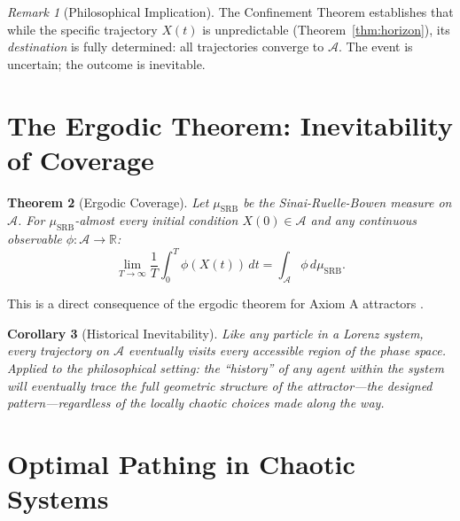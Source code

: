 \documentclass[12pt, a4paper]{article}
\theoremstyle{plain}
\newtheorem{theorem}{Theorem}[section]
\newtheorem{corollary}[theorem]{Corollary}
\theoremstyle{definition}
\theoremstyle{remark}
\newtheorem{remark}[theorem]{Remark}
\newcommand{\R}{\mathbb{R}}
\newcommand{\calA}{\mathcal{A}}
\begin{document}
\begin{remark}[Philosophical Implication]
  The Confinement Theorem establishes that while the specific trajectory
  $X(t)$ is unpredictable (Theorem~\ref{thm:horizon}), its \emph{destination}
  is fully determined: all trajectories converge to $\calA$. The event is
  uncertain; the outcome is inevitable.
\end{remark}

\section{The Ergodic Theorem: Inevitability of Coverage}\label{sec:ergodic}

\begin{theorem}[Ergodic Coverage]\label{thm:ergodic}
  Let $\mu_{\text{SRB}}$ be the Sinai-Ruelle-Bowen measure on $\calA$.
  For $\mu_{\text{SRB}}$-almost every initial condition $X(0) \in \calA$
  and any continuous observable $\phi: \calA \to \R$:
  \begin{equation}
    \lim_{T \to \infty} \frac{1}{T} \int_0^T \phi(X(t))\, dt
    = \int_{\calA} \phi\, d\mu_{\text{SRB}}.
  \end{equation}
\end{theorem}

This is a direct consequence of the ergodic theorem for Axiom A attractors
\citep{Bowen1975, Ruelle1976}.

\begin{corollary}[Historical Inevitability]\label{cor:history}
  Like any particle in a Lorenz system, every trajectory on $\calA$
  eventually visits every accessible region of the phase space. Applied
  to the philosophical setting: the ``history'' of any agent within the
  system will eventually trace the full geometric structure of the
  attractor---the designed pattern---regardless of the locally chaotic
  choices made along the way.
\end{corollary}

\section{Optimal Pathing in Chaotic Systems}\label{sec:optimal}
\end{document}
